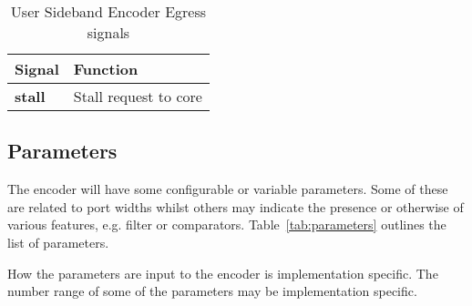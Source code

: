 \begin{table}[htp]
    \centering
    \caption{User Sideband Encoder Egress signals}
    \label{tab:engress-side-band}
    \begin{tabulary}{\textwidth}{|l|l|}
        \hline
        \textbf{Signal} & \textbf{Function} \\
        \hline
        \textbf{stall}& Stall request to core \\
        \hline
    \end{tabulary}
\end{table}

\subsection {Parameters}

The encoder will have some configurable or variable parameters. Some
of these are related to port widths whilst others may indicate the
presence or otherwise of various features, e.g. filter or comparators.
Table~\ref{tab:parameters} outlines the list of parameters.

How the parameters are input to the encoder is implementation specific. The number range of some of the parameters  may be implementation specific. 

